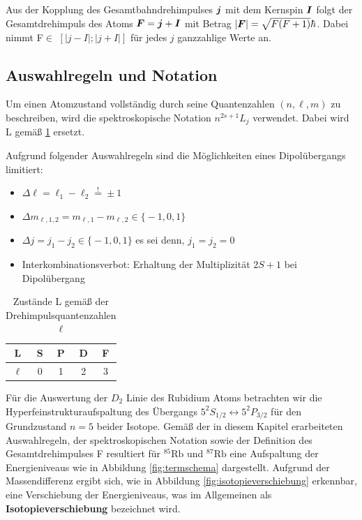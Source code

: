 \noindent Aus der Kopplung des Gesamtbahndrehimpulses $\boldsymbol{j}$ mit dem Kernspin $\boldsymbol{I}$ folgt der Gesamtdrehimpuls des Atoms $\boldsymbol{F}=\boldsymbol{j}+\boldsymbol{I}$ mit Betrag $\lvert \boldsymbol{F} \rvert = \sqrt{F(F+1)}\hbar$. Dabei nimmt F$\in$ $[\lvert j-I\rvert;\lvert j+I\rvert]$ für jedes $j$ ganzzahlige Werte an.

\subsection{Auswahlregeln und Notation}

\noindent Um einen Atomzustand vollständig durch seine Quantenzahlen $(n,\ell,m)$ zu beschreiben, wird die spektroskopische Notation $n^{2s+1}L_{j}$ verwendet. Dabei wird L gemäß \ref{tab:Atomzustände} ersetzt.

\noindent Aufgrund folgender Auswahlregeln sind die Möglichkeiten eines Dipolübergangs limitiert:
\begin{multicols}{2}
\begin{itemize}
    \item $\Delta \ell = \ell_{1} - \ell_{2} \overset{!}{=} \pm 1$
    \item  $\Delta m_{\ell,1,2} = m_{\ell,1} - m_{\ell,2} \in \bigl\{-1,0, 1\bigr\}$ \\
    \item $\Delta j = j_{1} - j_{2} \in \bigl\{-1, 0, 1\bigr\}$ es sei denn, $j_{1} = j_{2} = 0$
    \item Interkombinationsverbot: Erhaltung der Multiplizität $2S+1$ bei Dipolübergang
\end{itemize}
\end{multicols}

\begin{table}[h]
    \centering
    \begin{tabular}{c|cccc}
         L &S &P &D &F \\
         \hline
         $\ell$ &0 &1 &2 &3\\
    \end{tabular}
    \caption{Zustände L gemäß der Drehimpulsquantenzahlen $\ell$}
    \label{tab:Atomzustände}
\end{table}

\noindent Für die Auswertung der $D_{2}$ Linie des Rubidium Atoms betrachten wir die Hyperfeinstrukturaufspaltung des Übergangs $5^{2}S_{1/2} \leftrightarrow 5^{2}P_{3/2}$ für den Grundzustand $n=5$ beider Isotope. Gemäß der in diesem Kapitel erarbeiteten Auswahlregeln, der spektroskopischen Notation sowie der Definition des Gesamtdrehimpulses F resultiert für $^{85}\text{Rb}$ und $^{87}\text{Rb}$ eine Aufspaltung der Energieniveaus wie in Abbildung \ref{fig:termschema} dargestellt. Aufgrund der Massendifferenz ergibt sich, wie in Abbildung \ref{fig:isotopieverschiebung} erkennbar, eine Verschiebung der Energieniveaus, was im Allgemeinen als \textbf{Isotopieverschiebung} bezeichnet wird. 

